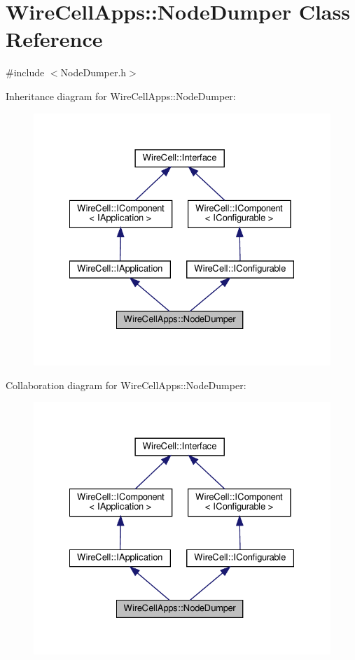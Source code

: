 \hypertarget{class_wire_cell_apps_1_1_node_dumper}{}\section{Wire\+Cell\+Apps\+:\+:Node\+Dumper Class Reference}
\label{class_wire_cell_apps_1_1_node_dumper}


{\ttfamily \#include $<$Node\+Dumper.\+h$>$}



Inheritance diagram for Wire\+Cell\+Apps\+:\+:Node\+Dumper\+:
\nopagebreak
\begin{figure}[H]
\begin{center}
\leavevmode
\includegraphics[width=328pt]{class_wire_cell_apps_1_1_node_dumper__inherit__graph}
\end{center}
\end{figure}


Collaboration diagram for Wire\+Cell\+Apps\+:\+:Node\+Dumper\+:
\nopagebreak
\begin{figure}[H]
\begin{center}
\leavevmode
\includegraphics[width=328pt]{class_wire_cell_apps_1_1_node_dumper__coll__graph}
\end{center}
\end{figure}
